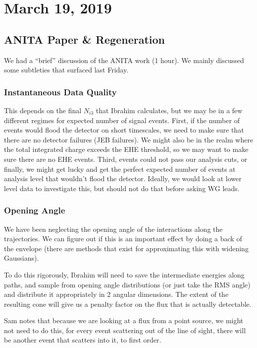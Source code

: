 \chapter{March 19, 2019}

\section{ANITA Paper \& Regeneration}
\label{ANITA}
We had a ``brief'' discussion of the ANITA work (1 hour). We mainly discussed some subtleties that surfaced last Friday. 

\subsection*{\textbf{Instantaneous Data Quality}}
This depends on the final $N_{i3}$ that Ibrahim calculates, but we may be in a few different regimes for expected number of signal events. First, if the number of events would flood the detector on short timescales, we need to make sure that there are no detector failures (JEB failures). We might also be in the realm where the total integrated charge exceeds the EHE threshold, so we may want to make sure there are no EHE events. Third, events could not pass our analysis cuts, or finally, we might get lucky and get the perfect expected number of events at analysis level that wouldn't flood the detector. Ideally, we would look at lower level data to investigate this, but should not do that before asking WG leads. 

\subsection*{\textbf{Opening Angle}}
We have been neglecting the opening angle of the interactions along the trajectories. We can figure out if this is an important effect by doing a back of the envelope (there are methods that exist for approximating this with widening Gaussians). 

To do this rigorously, Ibrahim will need to save the intermediate energies along paths, and sample from opening angle distributions (or just take the RMS angle) and distribute it appropriately in 2 angular dimensions. The extent of the resulting cone will give us a penalty factor on the flux that is actually detectable. 

Sam notes that because we are looking at a flux from a point source, we might not need to do this, for every event scattering out of the line of sight, there will be another event that scatters into it, to first order. 

